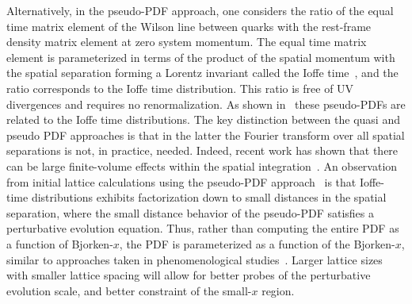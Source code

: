 Alternatively, in the pseudo-PDF approach, one considers the ratio of the equal time matrix element of the Wilson line between quarks with the rest-frame density matrix element at zero system momentum. The equal time matrix element is parameterized in terms of the product of the spatial momentum with the spatial separation forming a Lorentz invariant called the Ioffe time~\cite{Ioffe:1969kf,Braun:1994jq}, and the ratio corresponds to the Ioffe time distribution.
This ratio is free of UV divergences and requires no renormalization. As shown in~\cite{Radyushkin:2016hsy,Radyushkin:2017cyf} these pseudo-PDFs are related to the Ioffe time distributions. The key distinction between the quasi and pseudo PDF approaches is that in the latter the Fourier transform over all spatial separations is not, in practice, needed. Indeed, recent work has shown that there can be large finite-volume effects within the spatial integration~\cite{Briceno:2018lfj}. An observation from initial lattice calculations using the pseudo-PDF approach~\cite{Karpie:2018zaz,Karpie:2018zaz}  is that Ioffe-time distributions exhibits factorization down to small distances in the spatial separation, where the small distance behavior of the pseudo-PDF  satisfies a perturbative  evolution equation. Thus, rather than computing the entire PDF as a function of Bjorken-$x$, the PDF is parameterized as a function of the Bjorken-$x$, similar to approaches taken in phenomenological studies~\cite{Ball:2017nwa,Accardi:2016qay}. Larger lattice sizes with smaller lattice spacing will allow for better probes of the perturbative evolution scale, and better constraint of the small-$x$ region.


